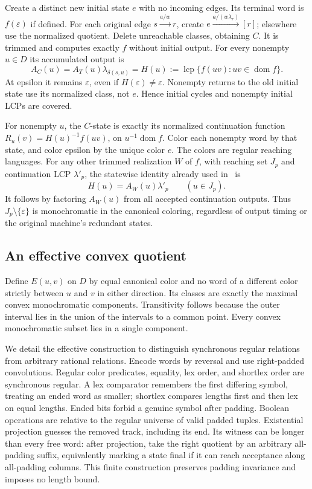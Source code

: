 \documentclass[acmsmall,screen,nonacm,11pt]{acmart}
\newcommand{\eps}{\varepsilon}
\newcommand{\lcp}{\operatorname{lcp}}
\newcommand{\dom}{\operatorname{dom}}
\theoremstyle{definition}
\begin{document}
Create a distinct new initial state $e$ with no incoming edges. Its terminal
word is $f(\eps)$ if defined. For each original edge
$s\xrightarrow{a/w}r$, create
$e\xrightarrow{a/(w\lambda_r)}[r]$; elsewhere use the normalized quotient.
Delete unreachable classes, obtaining $C$. It is trimmed and computes
exactly $f$ without initial output. For every nonempty $u\in D$ its
accumulated output is
\begin{equation}\label{eq:H}
 A_C(u)=A_T(u)\lambda_{\delta(s,u)}
       =H(u):=\lcp\{f(uv):uv\in\dom f\}.
\end{equation}
At epsilon it remains $\eps$, even if $H(\eps)\ne\eps$. Nonempty returns
to the old initial state use its normalized class, not $e$. Hence initial
cycles and nonempty initial LCPs are covered.

For nonempty $u$, the $C$-state is exactly its normalized continuation
function $R_u(v)=H(u)^{-1}f(uv)$, on $u^{-1}\dom f$. Color each nonempty
word by that state, and color epsilon by the unique color $e$. The colors
are regular reaching languages. For any other trimmed realization $W$ of
$f$, with reaching set $J_p$ and continuation LCP $\lambda'_p$, the
statewise identity already used in~\cite[Remark~3]{DP26} is
\begin{equation}\label{eq:otherH}
 H(u)=A_W(u)\lambda'_p\qquad(u\in J_p).
\end{equation}
It follows by factoring $A_W(u)$ from all accepted continuation outputs.
Thus $J_p\setminus\{\eps\}$ is monochromatic in the canonical coloring,
regardless of output timing or the original machine's redundant states.

\subsection{An effective convex quotient}

Define $E(u,v)$ on $D$ by equal canonical color and no word of a different
color strictly between $u$ and $v$ in either direction. Its classes are
exactly the maximal convex monochromatic components. Transitivity follows
because the outer interval lies in the union of the intervals to a common
point. Every convex monochromatic subset lies in a single component.

We detail the effective construction to distinguish synchronous regular
relations from arbitrary rational relations. Encode words by reversal and
use right-padded convolutions. Regular color predicates, equality, lex
order, and shortlex order are synchronous regular. A lex comparator
remembers the first differing symbol, treating an ended word as smaller;
shortlex compares lengths first and then lex on equal lengths. Ended bits
forbid a genuine symbol after padding. Boolean operations are relative
to the regular universe of valid padded tuples. Existential projection
guesses the removed track, including its end. Its witness can be longer
than every free word: after projection, take the right quotient by an
arbitrary all-padding suffix, equivalently marking a state final if it
can reach acceptance along all-padding columns. This finite construction
preserves padding invariance and imposes no length bound.
\end{document}
